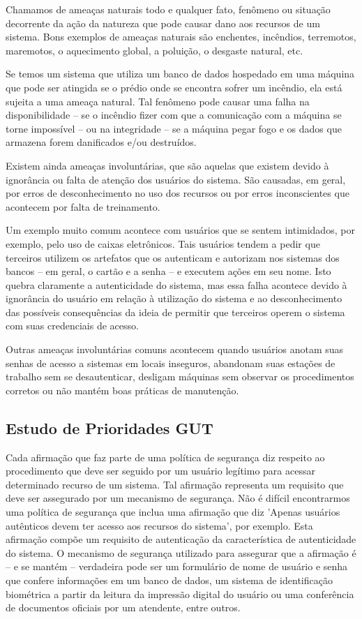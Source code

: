\documentclass[
	10pt,				%
	openright,			%
	twoside,			%
	a5paper,			%
	english,			%
	french,				%
	spanish,			%
	brazil,				%
	sumario=tradicional
]{abntex2}
\begin{document}
Chamamos de ameaças naturais todo e qualquer fato, fenômeno ou situação decorrente da ação da natureza que pode causar dano aos recursos de um sistema. Bons exemplos de ameaças naturais são enchentes, incêndios, terremotos, maremotos, o aquecimento global, a poluição, o desgaste natural, etc.

Se temos um sistema que utiliza um banco de dados hospedado em uma máquina que pode ser atingida se o prédio onde se encontra sofrer um incêndio, ela está sujeita a uma ameaça natural. Tal fenômeno pode causar uma falha na disponibilidade – se o incêndio fizer com que a comunicação com a máquina se torne impossível – ou na integridade – se a máquina pegar fogo e os dados que armazena forem danificados e/ou destruídos.

Existem ainda ameaças involuntárias, que são aquelas que existem devido à ignorância ou falta de atenção dos usuários do sistema. São causadas, em geral, por erros de desconhecimento no uso dos recursos ou por erros inconscientes que acontecem por falta de treinamento.

Um exemplo muito comum acontece com usuários que se sentem intimidados, por exemplo, pelo uso de caixas eletrônicos. Tais usuários tendem a pedir que terceiros utilizem os artefatos que os autenticam e autorizam nos sistemas dos bancos – em geral, o cartão e a senha – e executem ações em seu nome. Isto quebra claramente a autenticidade do sistema, mas essa falha acontece devido à ignorância do usuário em relação à utilização do sistema e ao desconhecimento das possíveis consequências da ideia de permitir que terceiros operem o sistema com suas credenciais de acesso.

Outras ameaças involuntárias comuns acontecem quando usuários anotam suas senhas de acesso a sistemas em locais inseguros, abandonam suas estações de trabalho sem se desautenticar, desligam máquinas sem observar os procedimentos corretos ou não mantém boas práticas de manutenção.

\subsection{Estudo de Prioridades GUT}

Cada afirmação que faz parte de uma política de segurança diz respeito ao procedimento que deve ser seguido por um usuário legítimo para acessar determinado recurso de um sistema. Tal afirmação representa um requisito que deve ser assegurado por um mecanismo de segurança. Não é difícil encontrarmos uma política de segurança que inclua uma afirmação que diz 'Apenas usuários autênticos devem ter acesso aos recursos do sistema', por exemplo. Esta afirmação compõe um requisito de autenticação da característica de autenticidade do sistema. O mecanismo de segurança utilizado para assegurar que a afirmação é – e se mantém – verdadeira pode ser um formulário de nome de usuário e senha que confere informações em um banco de dados, um sistema de identificação biométrica a partir da leitura da impressão digital do usuário ou uma conferência de documentos oficiais por um atendente, entre outros.
\end{document}
